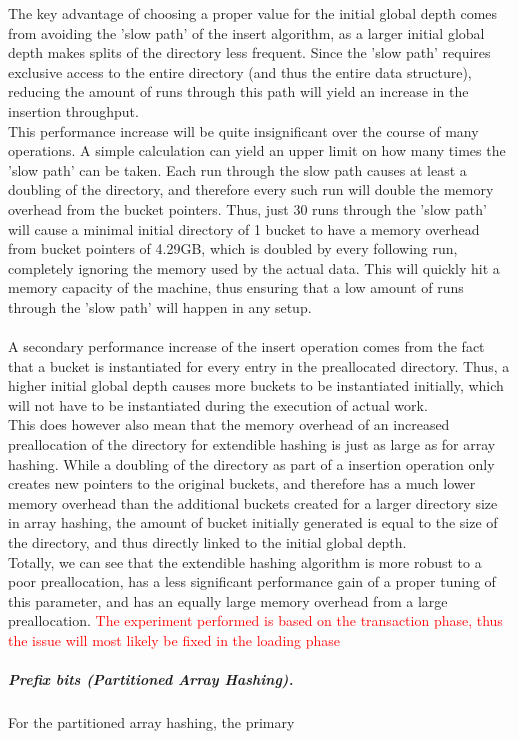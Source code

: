 \documentclass[11pt]{article} %
\begin{document}
The key advantage of choosing a proper value for the initial global depth comes from avoiding the 'slow path' of the insert algorithm, as a larger initial global depth makes splits of the directory less frequent. Since the 'slow path' requires exclusive access to the entire directory (and thus the entire data structure), reducing the amount of runs through this path will yield an increase in the insertion throughput. \\

This performance increase will be quite insignificant over the course of many operations. A simple calculation can yield an upper limit on how many times the 'slow path' can be taken. Each run through the slow path causes at least a doubling of the directory, and therefore every such run will double the memory overhead from the bucket pointers. Thus, just 30 runs through the 'slow path' will cause a minimal initial directory of 1 bucket to have a memory overhead from bucket pointers of 4.29GB, which is doubled by every following run, completely ignoring the memory used by the actual data. This will quickly hit a memory capacity of the machine, thus ensuring that a low amount of runs through the 'slow path' will happen in any setup.\\
\\

A secondary performance increase of the insert operation comes from the fact that a bucket is instantiated for every entry in the preallocated directory. Thus, a higher initial global depth causes more buckets to be instantiated initially, which will not have to be instantiated during the execution of actual work. \\

This does however also mean that the memory overhead of an increased preallocation of the directory for extendible hashing is just as large as for array hashing. While a doubling of the directory as part of a insertion operation only creates new pointers to the original buckets, and therefore has a much lower memory overhead than the additional buckets created for a larger directory size in array hashing, the amount of bucket initially generated is equal to the size of the directory, and thus directly linked to the initial global depth. \\

Totally, we can see that the extendible hashing algorithm is more robust to a poor preallocation, has a less significant performance gain of a proper tuning of this parameter, and has an equally large memory overhead from a large preallocation.
\textcolor{red}{The experiment performed is based on the transaction phase, thus the issue will most likely be fixed in the loading phase}
\subparagraph{Prefix bits (Partitioned Array Hashing).} 
For the partitioned array hashing, the primary 
\end{document}
